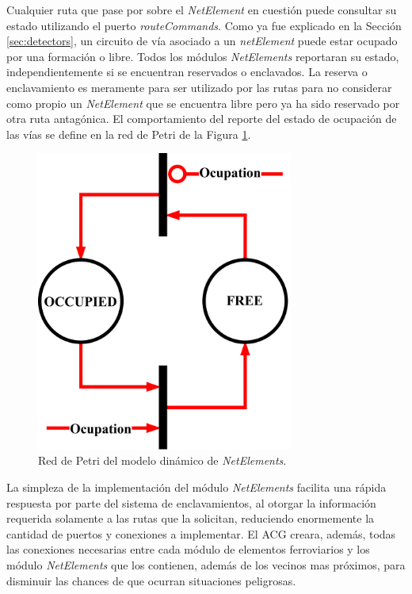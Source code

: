 Cualquier ruta que pase por sobre el \textit{NetElement} en cuestión puede consultar su estado utilizando el puerto \textit{routeCommands}. Como ya fue explicado en la Sección \ref{sec:detectors}, un circuito de vía asociado a un \textit{netElement} puede estar ocupado por una formación o libre. Todos los módulos \textit{NetElements} reportaran su estado, independientemente si se encuentran reservados o enclavados. La reserva o enclavamiento es meramente para ser utilizado por las rutas para no considerar como propio un \textit{NetElement} que se encuentra libre pero ya ha sido reservado por otra ruta antagónica. El comportamiento del reporte del estado de ocupación de las vías se define en la red de Petri de la Figura \ref{fig:NET_Petri}.

\begin{figure}[H]
	\centering
	\includegraphics[width=0.75\textwidth]{Figuras/NET_Petri}
	\centering\caption{Red de Petri del modelo dinámico de \textit{NetElements}.}
	\label{fig:NET_Petri}
\end{figure}

La simpleza de la implementación del módulo \textit{NetElements} facilita una rápida respuesta por parte del sistema de enclavamientos, al otorgar la información requerida solamente a las rutas que la solicitan, reduciendo enormemente la cantidad de puertos y conexiones a implementar. El ACG creara, además, todas las conexiones necesarias entre cada módulo de elementos ferroviarios y los módulo \textit{NetElements} que los contienen, además de los vecinos mas próximos, para disminuir las chances de que ocurran situaciones peligrosas.